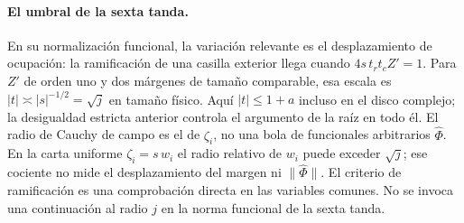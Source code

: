 \paragraph{El umbral de la sexta tanda.}
En su normalización funcional, la variación relevante es el desplazamiento de ocupación:
la ramificación de una casilla exterior llega cuando $4s\,t_rt_c Z'=1$.
Para $Z'$ de orden uno y dos márgenes de tamaño comparable, esa escala es
$|t|\asymp|s|^{-1/2}=\sqrt j$ en tamaño físico. Aquí $|t|\le1+a$ incluso en el disco
complejo; la desigualdad estricta anterior controla el argumento de la raíz en todo él.
El radio de Cauchy de campo es el de $\zeta_i$, no una bola de funcionales arbitrarios
$\widehat\Phi$. En la carta uniforme $\zeta_i=s\,w_i$ el radio relativo de $w_i$ puede
exceder $\sqrt j$; ese cociente no mide el desplazamiento del margen ni $\|\widehat\Phi\|$.
El criterio de ramificación es una comprobación directa en las variables comunes.
No se invoca una continuación al radio $j$ en la norma funcional de la sexta tanda.
